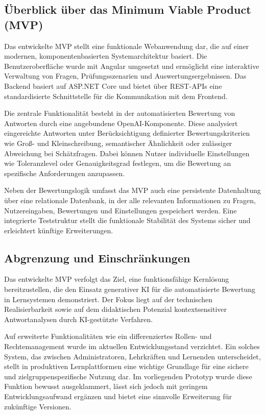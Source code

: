 \documentclass[a4paper,12pt]{article}
\begin{document}
\subsection{Überblick über das Minimum Viable Product (MVP)}
Das entwickelte MVP stellt eine funktionale Webanwendung dar, die auf einer modernen, komponentenbasierten Systemarchitektur basiert. Die Benutzeroberfläche wurde mit Angular umgesetzt und ermöglicht eine interaktive Verwaltung von Fragen, Prüfungsszenarien und Auswertungsergebnissen. Das Backend basiert auf ASP.NET Core und bietet über REST-APIs eine standardisierte Schnittstelle für die Kommunikation mit dem Frontend.

Die zentrale Funktionalität besteht in der automatisierten Bewertung von Antworten durch eine angebundene OpenAI-Komponente. Diese analysiert eingereichte Antworten unter Berücksichtigung definierter Bewertungskriterien wie Groß- und Kleinschreibung, semantischer Ähnlichkeit oder zulässiger Abweichung bei Schätzfragen. Dabei können Nutzer individuelle Einstellungen wie Toleranzlevel oder Genauigkeitsgrad festlegen, um die Bewertung an spezifische Anforderungen anzupassen.

Neben der Bewertungslogik umfasst das MVP auch eine persistente Datenhaltung über eine relationale Datenbank, in der alle relevanten Informationen zu Fragen, Nutzereingaben, Bewertungen und Einstellungen gespeichert werden. Eine integrierte Teststruktur stellt die funktionale Stabilität des Systems sicher und erleichtert künftige Erweiterungen.

\subsection{Abgrenzung und Einschränkungen}
Das entwickelte MVP verfolgt das Ziel, eine funktionsfähige Kernlösung bereitzustellen, die den Einsatz generativer KI für die automatisierte Bewertung in Lernsystemen demonstriert. Der Fokus liegt auf der technischen Realisierbarkeit sowie auf dem didaktischen Potenzial kontextsensitiver Antwortanalysen durch KI-gestützte Verfahren.

Auf erweiterte Funktionalitäten wie ein differenziertes Rollen- und Rechtemanagement wurde im aktuellen Entwicklungsstand verzichtet. Ein solches System, das zwischen Administratoren, Lehrkräften und Lernenden unterscheidet, stellt in produktiven Lernplattformen eine wichtige Grundlage für eine sichere und zielgruppenspezifische Nutzung dar. Im vorliegenden Prototyp wurde diese Funktion bewusst ausgeklammert, lässt sich jedoch mit geringem Entwicklungsaufwand ergänzen und bietet eine sinnvolle Erweiterung für zukünftige Versionen.
\end{document}
